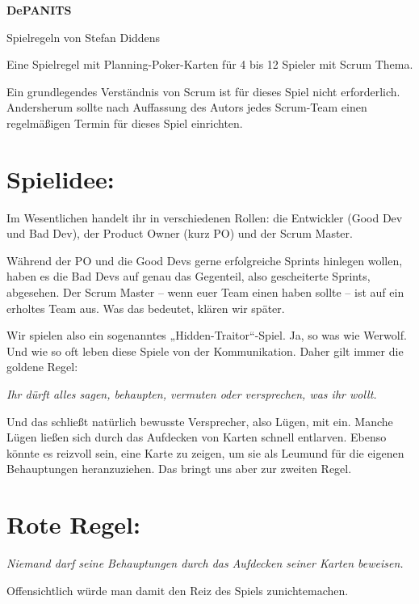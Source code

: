 \documentclass[10pt,a4paper]{article}
\newcommand{\rulequote}[1]{%
  \begin{center}
    \itshape #1
  \end{center}
}
\begin{document}
\begin{center}
  {\color{structuregray}\headingfont\bfseries{}\fontsize{27}{30}\selectfont DePANITS\par}
  \vspace{0.35em}
  {\large Spielregeln von Stefan Diddens\par}
\end{center}

Eine Spielregel mit Planning-Poker-Karten für 4 bis 12 Spieler mit Scrum Thema.

Ein grundlegendes Verständnis von Scrum ist für dieses Spiel nicht erforderlich. Andersherum sollte nach Auffassung des Autors jedes Scrum-Team einen regelmäßigen Termin für dieses Spiel einrichten.

\section{Spielidee:}

Im Wesentlichen handelt ihr in verschiedenen Rollen: die Entwickler (Good Dev und Bad Dev), der Product Owner (kurz PO) und der Scrum Master.

Während der PO und die Good Devs gerne erfolgreiche Sprints hinlegen wollen, haben es die Bad Devs auf genau das Gegenteil, also gescheiterte Sprints, abgesehen. Der Scrum Master -- wenn euer Team einen haben sollte -- ist auf ein erholtes Team aus. Was das bedeutet, klären wir später.

Wir spielen also ein sogenanntes „Hidden-Traitor“-Spiel. Ja, so was wie Werwolf. Und wie so oft leben diese Spiele von der Kommunikation. Daher gilt immer die goldene Regel:

\rulequote{Ihr dürft alles sagen, behaupten, vermuten oder versprechen, was ihr wollt.}

Und das schließt natürlich bewusste Versprecher, also Lügen, mit ein. Manche Lügen ließen sich durch das Aufdecken von Karten schnell entlarven. Ebenso könnte es reizvoll sein, eine Karte zu zeigen, um sie als Leumund für die eigenen Behauptungen heranzuziehen. Das bringt uns aber zur zweiten Regel.

\section{Rote Regel:}

\rulequote{Niemand darf seine Behauptungen durch das Aufdecken seiner Karten beweisen.}

Offensichtlich würde man damit den Reiz des Spiels zunichtemachen.
\end{document}
